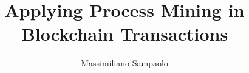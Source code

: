 \documentclass{unicam_thesis}
\title{Applying Process Mining in Blockchain Transactions}
\author{Massimiliano Sampaolo}
\begin{document}
\maketitle
\pagestyle{empty}

\renewcommand{\contentsname}{Index}
\renewcommand{\listfigurename}{List of figures}
\renewcommand{\figurename}{Figure}


\tableofcontents
\listoffigures
\lstlistoflistings

\newpage

\pagestyle{fancy}
\cleardoublepage{}
\setlength{\headheight}{15pt}
\renewcommand{\sectionmark}[1]{\markright{#1}{}} \fancyhf{}
\fancyhead[L]{\textit{\nouppercase{\rightmark}}}
\fancyhead[RO]{\textit{\nouppercase{\rightmark}}}
\fancyfoot[C]{\thepage}












\end{document}
